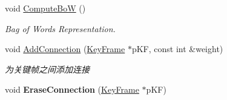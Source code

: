 \begin{DoxyCompactItemize}
\item 
void \hyperlink{classORB__SLAM2_1_1KeyFrame_ac376017c23823c05a6bb851ffb2fdd8f}{Compute\-Bo\-W} ()
\begin{DoxyCompactList}\small\item\em Bag of Words Representation. \end{DoxyCompactList}\item 
void \hyperlink{classORB__SLAM2_1_1KeyFrame_a8d21a23485b7c104a73d6ad3cccf4e93}{Add\-Connection} (\hyperlink{classORB__SLAM2_1_1KeyFrame}{Key\-Frame} $\ast$p\-K\-F, const int \&weight)
\begin{DoxyCompactList}\small\item\em 为关键帧之间添加连接 \end{DoxyCompactList}\item 
\hypertarget{classORB__SLAM2_1_1KeyFrame_a0a2e676f5e594cf9330e197a2c7df378}{void {\bfseries Erase\-Connection} (\hyperlink{classORB__SLAM2_1_1KeyFrame}{Key\-Frame} $\ast$p\-K\-F)}\label{classORB__SLAM2_1_1KeyFrame_a0a2e676f5e594cf9330e197a2c7df378}


\end{DoxyCompactItemize}
